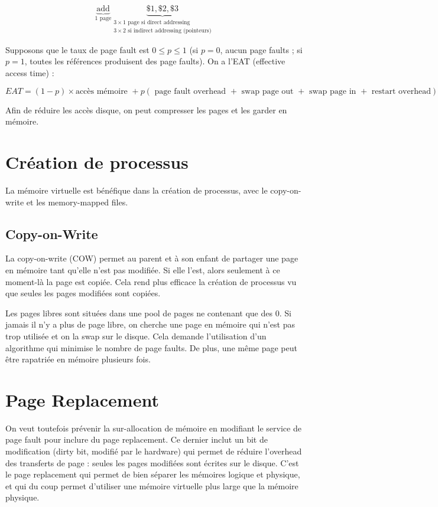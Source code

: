 	$$\underbrace{\text{add}}_{1\text{ page}} \underbrace{\$1, \$2, \$3}_{\substack{3 \times 1 \text{ page si direct addressing}\\3 \times 2 \text{ si indirect addressing (pointeurs)}}}$$
	
	
	
	Supposons que le taux de page fault est $0 \leq p \leq 1$ (si $p = 0$, aucun page faults ; si $p = 1$, toutes les références produisent des page faults). On a l'EAT (effective access time) :
	
	$$EAT = (1 - p) \times \text{accès mémoire } + p (\text{ page fault overhead } + \text{ swap page out } + \text{ swap page in } + \text{ restart overhead})$$
	
	Afin de réduire les accès disque, on peut compresser les pages et les garder en mémoire.
	
\section{Création de processus}

La mémoire virtuelle est bénéfique dans la création de processus, avec le copy-on-write et les memory-mapped files.

	\subsection{Copy-on-Write}
	
	La copy-on-write (COW) permet au parent et à son enfant de partager une page en mémoire tant qu'elle n'est pas modifiée. Si elle l'est, alors seulement à ce moment-là la page est copiée. Cela rend plus efficace la création de processus vu que seules les pages modifiées sont copiées.
	
	Les pages libres sont situées dans une pool de pages ne contenant que des 0. Si jamais il n'y a plus de page libre, on cherche une page en mémoire qui n'est pas trop utilisée et on la swap sur le disque. Cela demande l'utilisation d'un algorithme qui minimise le nombre de page faults. De plus, une même page peut être rapatriée en mémoire plusieurs fois.
	
	
\section{Page Replacement}
	
	On veut toutefois prévenir la sur-allocation de mémoire en modifiant le service de page fault pour inclure du page replacement. Ce dernier inclut un bit de modification (dirty bit, modifié par le hardware) qui permet de réduire l'overhead des transferts de page : seules les pages modifiées sont écrites sur le disque. C'est le page replacement qui permet de bien séparer les mémoires logique et physique, et qui du coup permet d'utiliser une mémoire virtuelle plus large que la mémoire physique.
	

